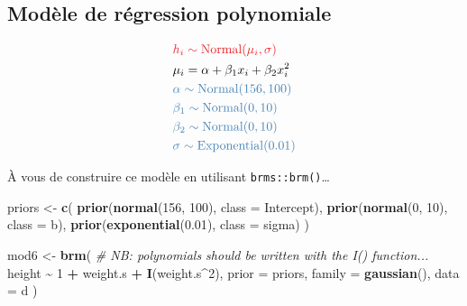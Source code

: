 \documentclass[
  a4paper,11pt,twoside,onecolumn,openright,final,oldfontcommands]{memoir}
\newenvironment{Shaded}{\begin{snugshade}}{\end{snugshade}}
\newcommand{\CommentTok}[1]{\textcolor[rgb]{0.56,0.35,0.01}{\textit{#1}}}
\newcommand{\DataTypeTok}[1]{\textcolor[rgb]{0.13,0.29,0.53}{#1}}
\newcommand{\DecValTok}[1]{\textcolor[rgb]{0.00,0.00,0.81}{#1}}
\newcommand{\FloatTok}[1]{\textcolor[rgb]{0.00,0.00,0.81}{#1}}
\newcommand{\KeywordTok}[1]{\textcolor[rgb]{0.13,0.29,0.53}{\textbf{#1}}}
\newcommand{\NormalTok}[1]{#1}
\newcommand{\OperatorTok}[1]{\textcolor[rgb]{0.81,0.36,0.00}{\textbf{#1}}}
\newcommand{\StringTok}[1]{\textcolor[rgb]{0.31,0.60,0.02}{#1}}
\theoremstyle{definition}
\theoremstyle{definition}
\theoremstyle{definition}
\theoremstyle{remark}
\begin{document}
\hypertarget{moduxe8le-de-ruxe9gression-polynomiale}{%
\subsection{Modèle de régression polynomiale}\label{moduxe8le-de-ruxe9gression-polynomiale}}

\[
\begin{aligned}
&\color{orangered}{h_{i} \sim \mathrm{Normal}(\mu_{i}, \sigma)} \\
&\mu_{i} = \alpha + \beta_{1} x_{i} + \beta_{2} x_{i}^{2} \\
&\color{steelblue}{\alpha \sim \mathrm{Normal}(156, 100)} \\
&\color{steelblue}{\beta_{1} \sim \mathrm{Normal}(0, 10)} \\
&\color{steelblue}{\beta_{2} \sim \mathrm{Normal}(0, 10)} \\
&\color{steelblue}{\sigma \sim \mathrm{Exponential}(0.01)} \\
\end{aligned}
\]

À vous de construire ce modèle en utilisant \texttt{brms::brm()}\ldots{}

\begin{Shaded}
\begin{Highlighting}[]
\NormalTok{priors \textless{}{-}}\StringTok{ }\KeywordTok{c}\NormalTok{(}
  \KeywordTok{prior}\NormalTok{(}\KeywordTok{normal}\NormalTok{(}\DecValTok{156}\NormalTok{, }\DecValTok{100}\NormalTok{), }\DataTypeTok{class =}\NormalTok{ Intercept),}
  \KeywordTok{prior}\NormalTok{(}\KeywordTok{normal}\NormalTok{(}\DecValTok{0}\NormalTok{, }\DecValTok{10}\NormalTok{), }\DataTypeTok{class =}\NormalTok{ b),}
  \KeywordTok{prior}\NormalTok{(}\KeywordTok{exponential}\NormalTok{(}\FloatTok{0.01}\NormalTok{), }\DataTypeTok{class =}\NormalTok{ sigma)}
\NormalTok{  )}

\NormalTok{mod6 \textless{}{-}}\StringTok{ }\KeywordTok{brm}\NormalTok{(}
  \CommentTok{\# NB: polynomials should be written with the I() function...}
\NormalTok{  height }\OperatorTok{\textasciitilde{}}\StringTok{ }\DecValTok{1} \OperatorTok{+}\StringTok{ }\NormalTok{weight.s }\OperatorTok{+}\StringTok{ }\KeywordTok{I}\NormalTok{(weight.s}\OperatorTok{\^{}}\DecValTok{2}\NormalTok{),}
  \DataTypeTok{prior =}\NormalTok{ priors,}
  \DataTypeTok{family =} \KeywordTok{gaussian}\NormalTok{(),}
  \DataTypeTok{data =}\NormalTok{ d}
\NormalTok{  )}
\end{Highlighting}
\end{Shaded}
\end{document}
